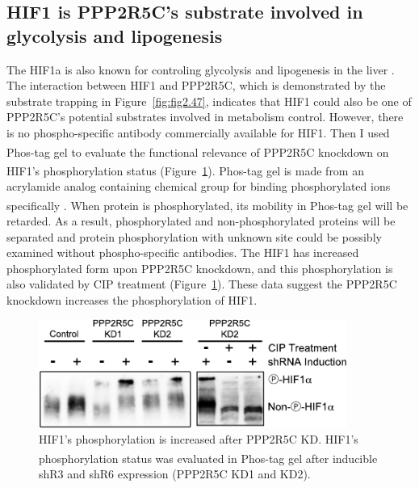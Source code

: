\subsection{HIF1\texorpdfstring{\textalpha}{a}{} is PPP2R5C's substrate involved in glycolysis and lipogenesis}

The \gls{HIF1a} is also known for controling glycolysis and lipogenesis in the liver \cite{ochiai_disruption_2011,nath_hepatocyte-specific_2011,li_altered_2006,li_intermittent_2005, wang_ablation_2009}. The interaction between HIF1\textalpha{} and PPP2R5C, which is demonstrated by the substrate trapping in Figure~\ref{fig:fig2.47}, indicates that HIF1\textalpha{} could also be one of PPP2R5C's potential substrates involved in metabolism control. However, there is no phospho-specific antibody commercially available for HIF1\textalpha{}. Then I used Phos-tag\textsuperscript{\textregistered} gel to evaluate the functional relevance of PPP2R5C knockdown on HIF1\textalpha{}'s phosphorylation status (Figure~\ref{fig:fig2.51}). Phos-tag\textsuperscript{\textregistered} gel is made from an acrylamide analog containing chemical group for binding phosphorylated ions specifically \cite{tomida_detection_2008,kinoshita_improved_2011,marelli-berg_molecular_2012,hosokawa_quantitative_2010,kinoshita_separation_2009}. When protein is phosphorylated, its mobility in Phos-tag\textsuperscript{\textregistered} gel will be retarded. As a result, phosphorylated and non-phosphorylated proteins will be separated and protein phosphorylation with unknown site could be possibly examined without phospho-specific antibodies. The HIF1\textalpha{} has increased phosphorylated form upon PPP2R5C knockdown, and this phosphorylation is also validated by CIP treatment (Figure~\ref{fig:fig2.51}). These data suggest the PPP2R5C knockdown increases the phosphorylation of HIF1\textalpha{}.

\begin{figure}[htbp]
\centering
\includegraphics[width=0.9\textwidth]{figs/fig2-51 hif phospho.pdf}
\caption[HIF1\textalpha's phosphorylation analysis by Phos-tag\textsuperscript{\textregistered}]{\footnotesize HIF1\textalpha{}'s phosphorylation is increased after PPP2R5C KD. HIF1\textalpha{}'s phosphorylation status was evaluated in Phos-tag\textsuperscript{\textregistered} gel after inducible shR3 and shR6 expression (PPP2R5C KD1 and KD2).}
\label{fig:fig2.51}
\end{figure}

